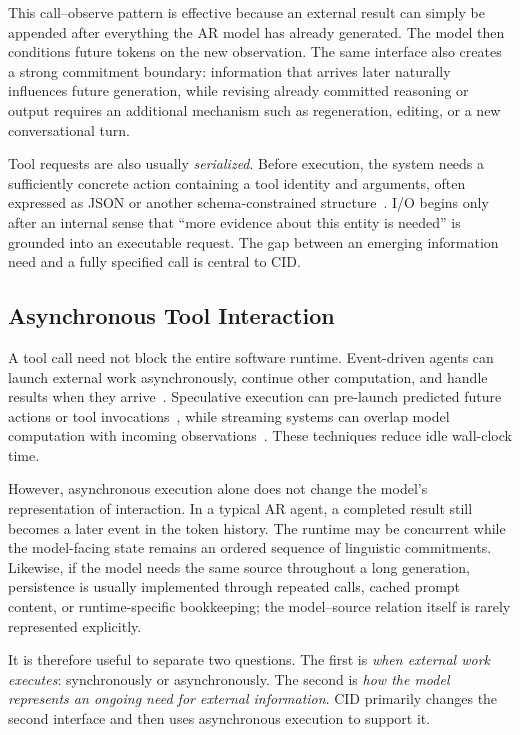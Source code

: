 This call--observe pattern is effective because an external result can simply be appended after everything the AR model has already generated. The model then conditions future tokens on the new observation. The same interface also creates a strong commitment boundary: information that arrives later naturally influences future generation, while revising already committed reasoning or output requires an additional mechanism such as regeneration, editing, or a new conversational turn.

Tool requests are also usually \emph{serialized}. Before execution, the system needs a sufficiently concrete action containing a tool identity and arguments, often expressed as JSON or another schema-constrained structure~\citep{patil2024gorilla,li2023apibank,patil2025bfcl}. I/O begins only after an internal sense that ``more evidence about this entity is needed'' is grounded into an executable request. The gap between an emerging information need and a fully specified call is central to CID.

\subsection{Asynchronous Tool Interaction}

A tool call need not block the entire software runtime. Event-driven agents can launch external work asynchronously, continue other computation, and handle results when they arrive~\citep{ginart2024asynchronous}. Speculative execution can pre-launch predicted future actions or tool invocations~\citep{ye2026speculativeactions,sui2026paste}, while streaming systems can overlap model computation with incoming observations~\citep{hooper2026realtime}. These techniques reduce idle wall-clock time.

However, asynchronous execution alone does not change the model's representation of interaction. In a typical AR agent, a completed result still becomes a later event in the token history. The runtime may be concurrent while the model-facing state remains an ordered sequence of linguistic commitments. Likewise, if the model needs the same source throughout a long generation, persistence is usually implemented through repeated calls, cached prompt content, or runtime-specific bookkeeping; the model--source relation itself is rarely represented explicitly.

It is therefore useful to separate two questions. The first is \emph{when external work executes}: synchronously or asynchronously. The second is \emph{how the model represents an ongoing need for external information}. CID primarily changes the second interface and then uses asynchronous execution to support it.

